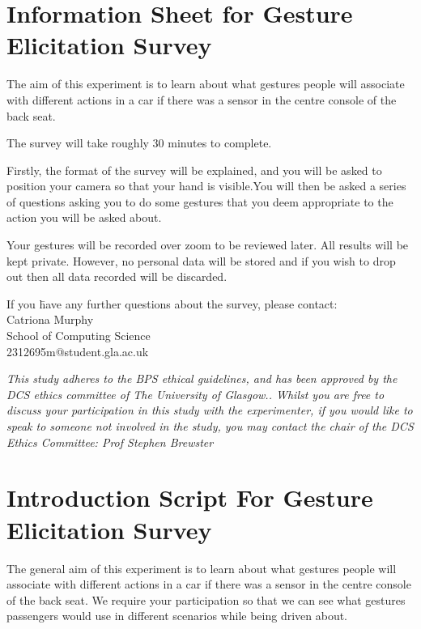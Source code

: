 \documentclass{l4proj}
\begin{document}
\begin{appendices}
\section{Information Sheet for Gesture Elicitation Survey}
\label{section:inforSheetGE}
The aim of this experiment is to learn about what gestures people will associate with different actions in a car if there was a sensor in the centre console of the back seat.

The survey will take roughly 30 minutes to complete.

Firstly, the format of the survey will be explained, and you will be asked to position your camera so that your hand is visible.You will then be asked a series of questions asking you to do some gestures that you deem appropriate to the action you will be asked about.  

Your gestures will be recorded over zoom to be reviewed later. All results will be kept private. However, no personal data will be stored and if you wish to drop out then all data recorded will be discarded. 

\begin{tabbing}
If you \=have any further questions about the survey, please contact:\\
\> Catriona Murphy\\

\>School of Computing Science\\

\>2312695m@student.gla.ac.uk\\

\end{tabbing}

\emph{This study adheres to the BPS ethical guidelines, and has been approved by the DCS ethics committee of The University of Glasgow.. Whilst you are free to discuss your participation in this study with the experimenter, if you would like to speak to someone not involved in the study, you may contact the chair of the DCS Ethics Committee: Prof Stephen Brewster}


\section{Introduction Script For Gesture Elicitation Survey}
\label{section:introScriptGE}
The general aim of this experiment is to learn about what gestures people will associate with different actions in a car if there was a sensor in the centre console of the back seat. We require your participation so that we can see what gestures passengers would use in different scenarios while being driven about.


\end{appendices}
\end{document}
